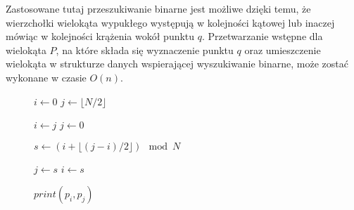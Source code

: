 \begin{figure}[htp]
  \caption{\label{fig:binstruct}}
\end{figure}

Zastosowane tutaj przeszukiwanie binarne jest możliwe dzięki temu, że
wierzchołki wielokąta wypukłego występują w kolejności kątowej lub
inaczej mówiąc w kolejności krążenia wokół punktu $q$. Przetwarzanie
wstępne dla wielokąta $P$, na które składa się wyznaczenie punktu $q$
oraz umieszczenie wielokąta w strukturze danych wspierającej
wyszukiwanie binarne, może zostać wykonane w czasie $O(n)$.


\begin{figure}[htp]
\begin{algorithmic}[1]

\State $i \gets 0$
\State $j \gets \lfloor N/2 \rfloor$

        \State $i \gets j$
        \State $j \gets 0$
    \EndIf
\EndIf

    \State $s \gets (i + \lfloor (j - i) / 2 \rfloor) \mod N$

        \State $j \gets s$
    \Else
        \State $i \gets s$
    \EndIf
\EndWhile

\State $print(p_{i}, p_{j})$
\EndProcedure

\end{algorithmic}
\caption{\label{alg:findwedge}}
\end{figure}

